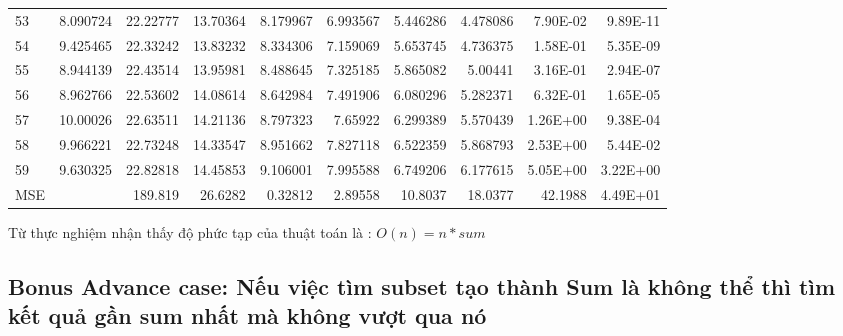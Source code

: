 \documentclass[a4paper]{article}
\begin{document}
{\begin{tabular}{|l|r|r|r|r|r|r|r|r|r|}
    {53} & 8.090724 & 22.22777 & 13.70364 & 8.179967 & 6.993567 & 5.446286 & 4.478086 & 7.90E-02 & 9.89E-11 \\
    {54} & 9.425465 & 22.33242 & 13.83232 & 8.334306 & 7.159069 & 5.653745 & 4.736375 & 1.58E-01 & 5.35E-09 \\
    {55} & 8.944139 & 22.43514 & 13.95981 & 8.488645 & 7.325185 & 5.865082 & 5.00441 & 3.16E-01 & 2.94E-07 \\
    {56} & 8.962766 & 22.53602 & 14.08614 & 8.642984 & 7.491906 & 6.080296 & 5.282371 & 6.32E-01 & 1.65E-05 \\
    {57} & 10.00026 & 22.63511 & 14.21136 & 8.797323 & 7.65922 & 6.299389 & 5.570439 & 1.26E+00 & 9.38E-04 \\
    {58} & 9.966221 & 22.73248 & 14.33547 & 8.951662 & 7.827118 & 6.522359 & 5.868793 & 2.53E+00 & 5.44E-02 \\
    {59} & 9.630325 & 22.82818 & 14.45853 & 9.106001 & 7.995588 & 6.749206 & 6.177615 & 5.05E+00 & 3.22E+00 \\
    \hline
    MSE   &       & 189.819 & 26.6282 & 0.32812 & 2.89558 & 10.8037 & 18.0377 & 42.1988 & 4.49E+01 \\
    \hline
\end{tabular}}

Từ thực nghiệm nhận thấy độ phức tạp của thuật toán là : $ O(n) =n *sum$

\subsection{Bonus Advance case: Nếu việc tìm subset tạo thành Sum là không thể thì tìm kết quả gần sum nhất mà không vượt qua nó}
\end{document}

